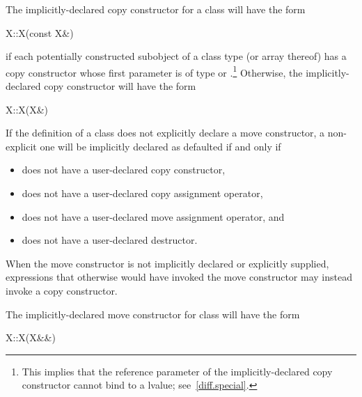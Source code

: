 \pnum
The implicitly-declared copy constructor for a class
will have the form

\begin{codeblock}
X::X(const X&)
\end{codeblock}

if each potentially constructed subobject of a class type
(or array thereof)
has a copy constructor whose first parameter is of type
or
.\footnote{This implies that the reference parameter of the
implicitly-declared copy constructor
cannot bind to a
lvalue; see~\ref{diff.special}.}
Otherwise, the implicitly-declared copy constructor will have the form

\begin{codeblock}
X::X(X&)
\end{codeblock}

\pnum
{}%
If the definition of a class  does not explicitly declare
a move constructor, a non-explicit one will be
implicitly declared as defaulted if and only if

\begin{itemize}
\item
{} does not have a user-declared copy constructor,

\item
{} does not have a user-declared copy assignment operator,

\item
{} does not have a user-declared move assignment operator, and

\item
{} does not have a user-declared destructor.
\end{itemize}

\begin{note} When the move constructor is not implicitly declared or explicitly supplied,
expressions that otherwise would have invoked the move constructor may instead invoke
a copy constructor. \end{note}

\pnum
The implicitly-declared move constructor for class  will have the form
\begin{codeblock}
X::X(X&&)
\end{codeblock}

